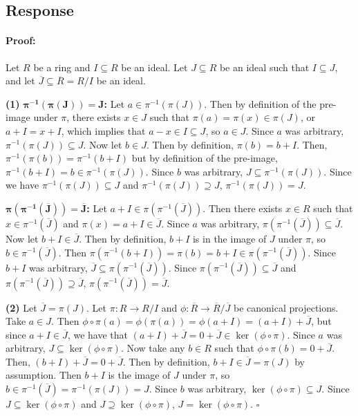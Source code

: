 \documentclass [12pt] {article}
\newenvironment{proof}{\paragraph{Proof:}}{\hfill$\square$}
\renewcommand{\bf}[1]{\textbf{{#1}}}
\begin{document}
\subsection*{Response}
\begin{proof}
    Let $R$ be a ring and $I \subseteq R$ be an ideal. Let $J \subseteq R$ be an ideal such that $I
    \subseteq J$, and let $\overline{J} \subseteq \overline{R} = R/I$ be an ideal. 
    \vspace{0.5em}

    \bf{(1)} \bf{$\bm{\pi^{-1}(\pi(J)) = J}$:}
    Let $a \in \pi^{-1}(\pi(J))$. Then by definition of the pre-image under $\pi$, there
    exists $x \in J$ such that $\pi(a) = \pi(x) \in \pi(J)$, or $a + I = x + I$, which implies that
    $a - x \in I \subseteq J$, so $a \in J$. Since $a$ was arbitrary, $\pi^{-1}(\pi(J)) \subseteq
    J$. Now let $b \in J$. Then by definition, $\pi(b) = b + I$. Then, $\pi^{-1}(\pi(b)) =
    \pi^{-1}(b + I)$ but by definition of the pre-image, $\pi^{-1}(b + I) = b \in \pi^{-1}(\pi(J))$.
    Since $b$ was arbitrary, $J \subseteq \pi^{-1}(\pi(J))$. Since we have $\pi^{-1}(\pi(J))
    \subseteq J$ and $\pi^{-1}(\pi(J)) \supseteq J$, $\pi^{-1}(\pi(J)) = J$.
    \vspace{0.5em}

    \bf{$\bm{\pi(\pi^{-1}(\overline{J})) = \overline{J}}$:}
    Let $a + I \in \pi(\pi^{-1}(\overline{J}))$. Then there exists $x \in R$ such that
    $x \in \pi^{-1}(\overline{J})$ and $\pi(x) = a + I \in \overline{J}$. Since $a$ was arbitrary,
    $\pi(\pi^{-1}(\overline{J})) \subseteq \overline{J}$. Now let $b + I \in \overline{J}$. 
    Then by definition, $b + I$ is in the image of $J$ under $\pi$, so $b \in \pi^{-1}(\overline{J})$.
    Then $\pi(\pi^{-1}(b + I)) = \pi(b) = b + I \in \pi(\pi^{-1}(\overline{J}))$.
    Since $b + I$ was arbitrary, $\overline{J} \subseteq \pi(\pi^{-1}(\overline{J}))$. 
    Since $\pi(\pi^{-1}(\overline{J})) \subseteq \overline{J}$ and 
    $\pi(\pi^{-1}(\overline{J})) \supseteq \overline{J}$,
    $\pi(\pi^{-1}(\overline{J})) = \overline{J}$.
    \vspace{1.5em}

    \bf{(2)} Let $\overline{J} = \pi(J)$. Let $\pi : R \to R/I$ and $\phi : \overline{R} \to
    \overline{R}/\overline{J}$ be canonical projections. Take 
    $a \in J$. Then 
    $
    \phi \circ \pi(a) 
    = \phi(\pi(a)) 
    = \phi(a + I) 
    = (a + I) + \overline{J}
    $, but since $a + I \in \overline{J}$, we have that
    $(a + I) + \overline{J} = 0 + \overline{J} \in \ker(\phi \circ \pi)$.
    Since $a$ was arbitrary, $J \subseteq \ker(\phi \circ \pi)$.
    Now take any $b \in R$ such that $\phi \circ \pi(b) = 0 + \overline{J}$. Then, 
    $(b + I) + \overline{J} = 0 + \overline{J}$. Then by definition, $b + I \in \overline{J} = \pi(J)$ 
    by assumption. Then $b + I$ is the image of $J$ under $\pi$, so $b \in \pi^{-1}(\overline{J}) = 
    \pi^{-1}(\pi(J)) = J$. Since $b$ was arbitrary, 
    $\ker(\phi \circ \pi) \subseteq J$. Since 
    $J \subseteq \ker(\phi \circ \pi)$ and
    $J \supseteq \ker(\phi \circ \pi)$,
    $J = \ker(\phi \circ \pi)$.
\end{proof}
\end{document}
